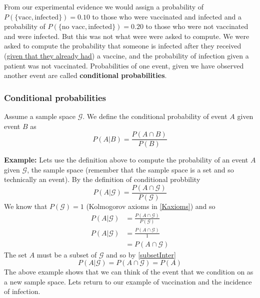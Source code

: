 From our experimental evidence we would assign a probability of $P(\{\text{vacc},\text{infected}\}) = 0.10$ to those who were vaccinated and infected and a probability of $P(\{\text{no vacc},\text{infected}\}) = 0.20$ to those who were not vaccinated and were infected. 
But this was not what were were asked to compute.
We were asked to compute the probability that someone is infected after they received (\underline{given that they already had}) a vaccine, and the probability of infection given a patient was not vaccinated.
Probabilities of one event, given we have observed another event are called \textbf{conditional probabilities}.

\subsubsection{Conditional probabilities}

Assume a sample space $\mathcal{G}$. We define the conditional probability of event $A$ given event $B$ as 
\begin{equation}
    P(A|B) = \frac{P(A \cap B)}{P(B)}
\end{equation}

\textbf{Example:} Lets use the definition above to compute the probability of an event $A$ given $\mathcal{G}$, the sample space (remember that the sample space is a set and so technically an event).
By the definition of conditional probbility 
\begin{equation}
    P(A|\mathcal{G}) = \frac{P(A \cap \mathcal{G})}{P(\mathcal{G})}
\end{equation}
We know that $P(\mathcal{G}) = 1$ (Kolmogorov axioms in \ref{Kaxioms}) and so 
\begin{align}
    P(A|\mathcal{G}) &= \frac{P(A \cap \mathcal{G})}{P(\mathcal{G})} \\
    P(A|\mathcal{G}) &= \frac{P(A \cap \mathcal{G})}{1}\\
                     &= P(A \cap \mathcal{G})
\end{align}
The set $A$ must be a subset of $\mathcal{G}$ and so by \eqref{subsetInter}
\begin{equation}
 P(A|\mathcal{G}) = P(A \cap \mathcal{G}) = P(A)
\end{equation}
The above example shows that we can think of the event that we condition on as a new sample space. 
Lets return to our example of vaccination and the incidence of infection.

